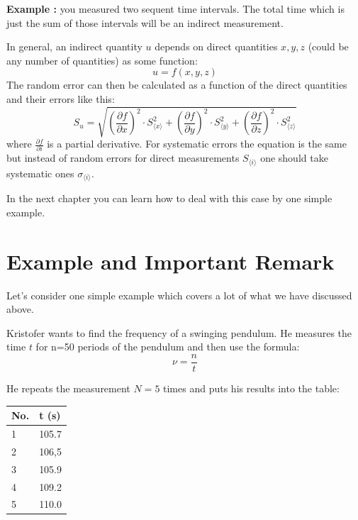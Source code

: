 \documentclass[12pt,a4paper]{article}
\newcommand{\example}[1]{\textcolor{MyBlue}{\textbf{Example {#1}: }}}
\begin{document}
\example{} you measured two sequent time intervals. The total time which is just the sum of those intervals will be an indirect measurement.

In general, an indirect quantity $u$ depends on direct quantities $x, y, z$ (could be any number of quantities) as some function:
\begin{equation}
u = f(x,y,z)
\end{equation}
The random error can then be calculated as a function of the direct quantities and their errors like this:
\begin{equation}\label{indirect_err}
\boxed{S_u = \sqrt{\left(\frac{\partial f}{\partial x}\right)^2\cdot S_{\langle x\rangle}^2+\left(\frac{\partial f}{\partial y}\right)^2\cdot S_{\langle y\rangle}^2+\left(\frac{\partial f}{\partial z}\right)^2\cdot S_{\langle z\rangle}^2}}
\end{equation}
where $\frac{\partial f}{\partial i}$ is a partial derivative. For systematic errors the equation is the same but instead of random errors for direct measurements $S_{\langle i\rangle}$ one should take systematic ones $\sigma_{\langle i\rangle}$.

In the next chapter you can learn how to deal with this case by one simple example.

\section{Example and Important Remark} \label{example}
Let's consider one simple example which covers a lot of what we have discussed above.

Kristofer wants to find the frequency of a swinging pendulum. He measures the time $t$ for n=50 periods of the pendulum and then use the formula:
\begin{equation}\label{nu}
\nu = \frac{n}{t}
\end{equation}

He repeats the measurement $N=5$ times and puts his results into the table:
\begin{center}
  \begin{tabular}{ | p{0.5cm} | p{1cm}|}
    \hline
  	No. & t (s) \\ \hline
    \hline
    \vspace{0.01cm} 1 & \vspace{0.01cm}105.7 \\ \hline
    \vspace{0.01cm} 2 & \vspace{0.01cm}106,5 \\ \hline
    \vspace{0.01cm} 3 & \vspace{0.01cm}105.9 \\\hline
    \vspace{0.01cm} 4 & \vspace{0.01cm}109.2 \\ \hline
    \vspace{0.01cm} 5 & \vspace{0.01cm}110.0 \\ \hline
  \end{tabular}
\end{center}
\end{document}
